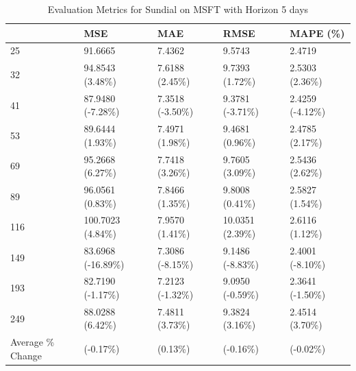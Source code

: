 \begin{table}
\caption{Evaluation Metrics for Sundial on MSFT with Horizon 5 days}
\label{tab:sundial_MSFT_h5_metrics}
\begin{tabular}{lllll}
\toprule
 & MSE & MAE & RMSE & MAPE (\%) \\
\midrule
25 & 91.6665 & 7.4362 & 9.5743 & 2.4719 \\
32 & 94.8543 (3.48\%) & 7.6188 (2.45\%) & 9.7393 (1.72\%) & 2.5303 (2.36\%) \\
41 & 87.9480 (-7.28\%) & 7.3518 (-3.50\%) & 9.3781 (-3.71\%) & 2.4259 (-4.12\%) \\
53 & 89.6444 (1.93\%) & 7.4971 (1.98\%) & 9.4681 (0.96\%) & 2.4785 (2.17\%) \\
69 & 95.2668 (6.27\%) & 7.7418 (3.26\%) & 9.7605 (3.09\%) & 2.5436 (2.62\%) \\
89 & 96.0561 (0.83\%) & 7.8466 (1.35\%) & 9.8008 (0.41\%) & 2.5827 (1.54\%) \\
116 & 100.7023 (4.84\%) & 7.9570 (1.41\%) & 10.0351 (2.39\%) & 2.6116 (1.12\%) \\
149 & 83.6968 (-16.89\%) & 7.3086 (-8.15\%) & 9.1486 (-8.83\%) & 2.4001 (-8.10\%) \\
193 & 82.7190 (-1.17\%) & 7.2123 (-1.32\%) & 9.0950 (-0.59\%) & 2.3641 (-1.50\%) \\
249 & 88.0288 (6.42\%) & 7.4811 (3.73\%) & 9.3824 (3.16\%) & 2.4514 (3.70\%) \\
Average \% Change & (-0.17\%) & (0.13\%) & (-0.16\%) & (-0.02\%) \\
\bottomrule
\end{tabular}
\end{table}
